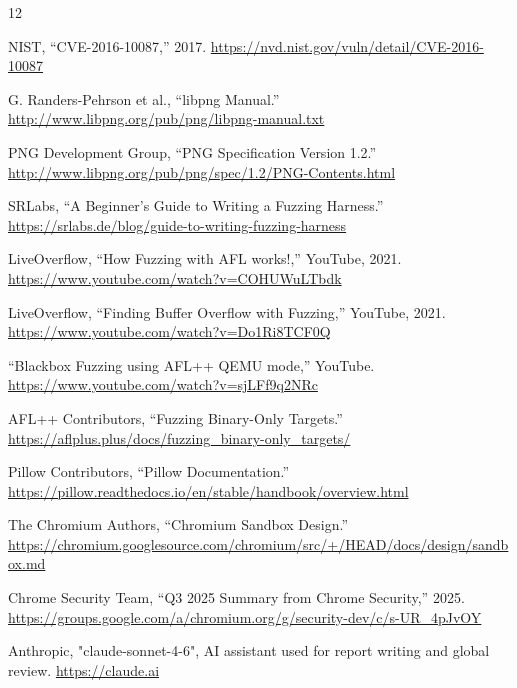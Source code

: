 \clearpage
\nocite{*}
{\small
\begin{thebibliography}{12}

  NIST, ``CVE-2016-10087,'' 2017.
  \url{https://nvd.nist.gov/vuln/detail/CVE-2016-10087}

  G. Randers-Pehrson et al., ``libpng Manual.''
  \url{http://www.libpng.org/pub/png/libpng-manual.txt}

  PNG Development Group, ``PNG Specification Version 1.2.''
  \url{http://www.libpng.org/pub/png/spec/1.2/PNG-Contents.html}

  SRLabs, ``A Beginner's Guide to Writing a Fuzzing Harness.''
  \url{https://srlabs.de/blog/guide-to-writing-fuzzing-harness}

  LiveOverflow, ``How Fuzzing with AFL works!,'' YouTube, 2021.
  \url{https://www.youtube.com/watch?v=COHUWuLTbdk}

  LiveOverflow, ``Finding Buffer Overflow with Fuzzing,'' YouTube, 2021.
  \url{https://www.youtube.com/watch?v=Do1Ri8TCF0Q}

  ``Blackbox Fuzzing using AFL++ QEMU mode,'' YouTube.
  \url{https://www.youtube.com/watch?v=sjLFf9q2NRc}

  AFL++ Contributors, ``Fuzzing Binary-Only Targets.''
  \url{https://aflplus.plus/docs/fuzzing_binary-only_targets/}

  Pillow Contributors, ``Pillow Documentation.''
  \url{https://pillow.readthedocs.io/en/stable/handbook/overview.html}

  The Chromium Authors, ``Chromium Sandbox Design.''
  \url{https://chromium.googlesource.com/chromium/src/+/HEAD/docs/design/sandbox.md}

  Chrome Security Team, ``Q3 2025 Summary from Chrome Security,'' 2025.
  \url{https://groups.google.com/a/chromium.org/g/security-dev/c/s-UR_4pJvOY}

  Anthropic, "claude-sonnet-4-6", AI assistant used for report
  writing and global review.
  \url{https://claude.ai}

  

  \end{thebibliography}
  }
  


